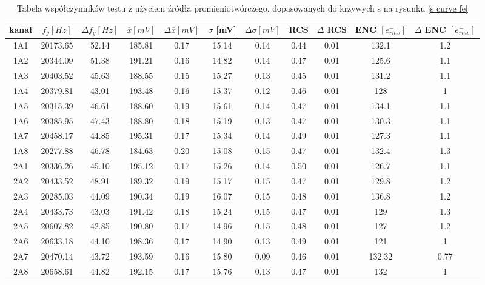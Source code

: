 \begin{appendices}
\begin{table}
    \centering
    \caption{Tabela współczynników testu z użyciem źródła promieniotwórczego, dopasowanych do krzywych s na rysunku \ref{s curve fe}}
    \label{tabela wsp fe}
    \begin{adjustbox}{width=1.1\linewidth,center}
            \begin{tabular}{|c|c|c|c|c|c|c|c|c|c|c|}
            \hline
            kanał & $f_g [Hz]$&$\Delta f_g [Hz]$&$\overline{x} [mV]$&$\Delta \overline{x} [mV]$&  $\sigma$ [mV]&  $\Delta \sigma [mV]$ &RCS&$\Delta$ RCS& ENC $[e^-_{rms}]$& $\Delta$ ENC $[e^-_{rms}]$\\ \hline
            1A1&20173.65&52.14&185.81&0.17&15.14&0.14&0.44&0.01&132.1&1.2  \\ \hline 
            1A2&20344.09&51.38&191.21&0.16&14.82&0.14&0.47&0.01&125.6&1.1  \\ \hline 
            1A3&20403.52&45.63&188.55&0.15&15.27&0.13&0.45&0.01&131.2&1.1  \\ \hline 
            1A4&20379.81&43.01&193.48&0.16&15.37&0.12&0.46&0.01&128&1  \\ \hline 
            1A5&20315.39&46.61&188.60&0.19&15.61&0.14&0.47&0.01&134.1&1.1  \\ \hline 
            1A6&20385.95&47.43&188.80&0.18&15.19&0.13&0.47&0.01&130.3&1.1  \\ \hline 
            1A7&20458.17&44.85&195.31&0.17&15.34&0.14&0.49&0.01&127.3&1.1  \\ \hline 
            1A8&20277.88&46.78&184.63&0.20&15.08&0.15&0.47&0.01&132.4&1.3  \\ \hline 
            2A1&20336.26&45.10&195.12&0.17&15.26&0.14&0.50&0.01&126.7&1.1  \\ \hline 
            2A2&20433.52&48.91&189.32&0.19&15.17&0.15&0.47&0.01&129.8&1.2  \\ \hline 
            2A3&20285.03&44.09&190.34&0.19&16.07&0.15&0.48&0.01&136.8&1.2  \\ \hline 
            2A4&20433.73&43.03&191.42&0.18&15.24&0.15&0.47&0.01&129&1.3  \\ \hline 
            2A5&20607.82&42.85&190.80&0.17&14.96&0.15&0.48&0.01&127&1.2  \\ \hline 
            2A6&20633.18&44.10&198.36&0.17&14.90&0.13&0.49&0.01&121&1  \\ \hline 
            2A7&20470.14&43.72&193.59&0.16&15.80&0.09&0.46&0.01&132.32&0.77  \\ \hline 
            2A8&20658.61&44.82&192.15&0.17&15.76&0.13&0.47&0.01&132&1  \\ \hline 
            \end{tabular}
    \end{adjustbox}

\end{table}

\end{appendices}